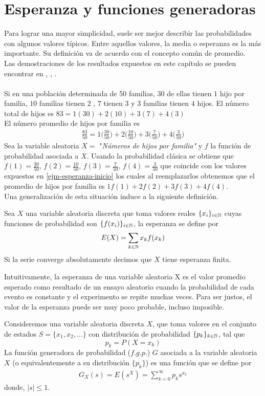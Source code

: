 \section{Esperanza y funciones generadoras}
Para lograr una mayor simplicidad, suele ser mejor describir las probabilidades con algunos valores típicos. Entre aquellos valores, la media o esperanza es la más importante. Su definición va de acuerdo con el concepto común de promedio. \\Las demostraciones de los resultados expuestos en este capítulo se pueden encontrar en \cite{Rincon1}, \cite{Rincon2},  \cite{Feller}.
\\\\
Si en una población determinada de 50 familias, $30$ de ellas tienen $1$ hijo por familia, $10$ familias tienen $2$ , $7$ tienen $3$ y $3$ familias tienen $4$ hijos. El número total de hijos es $83=1(30)+2(10)+3(7)+4(3)$\\
El número promedio de hijos por familia es 
\begin{eqnarray}
    \label{ejm-esperanza-inicio}
    \frac{83}{50}= 1\big(\frac{30}{50}\big)+2\big(\frac{10}{50}\big)+3\big(\frac{7}{50}\big)+4\big(\frac{3}{50}\big)
\end{eqnarray}
Sea la variable aleatoria $X=$ "\textit{Números de hijos por familia"} y $f$ la función de probabilidad asociada a $X$. Usando la probabilidad clásica se obtiene que $f(1)=\frac{30}{50}$, $f(2)=\frac{10}{50}$, $f(3)=\frac{7}{50}$, $f(4)=\frac{3}{50}$ que coincide con los valores expuestos en \ref{ejm-esperanza-inicio} los cuales al reemplazarlos obtenemos que el promedio de hijos por familia es $1f(1)+2f(2)+3f(3)+4f(4)$.\\
Una generalización de esta situación induce a la siguiente definición.
\begin{Def}
    Sea $X$ una variable aleatoria discreta que toma valores reales $\{x_i\}_{i\in{\mathbb{N}}}$ cuyas funciones de probabilidad son $\{f(x_i)\}_{i\in{\mathbb{N}}}$, la esperanza se define por $$E(X)=\sum_{k\in{\mathbb{N}}} x_k f(x_k)$$ Si la serie converge absolutamente decimos que $X$ tiene esperanza finita.
\end{Def}
Intuitivamente, la esperanza de una variable aleatoria X es el valor promedio esperado como resultado de un ensayo aleatorio cuando la probabilidad de cada evento es constante y el experimento se repite muchas veces. Para ser justos, el valor de la esperanza puede ser muy poco probable, incluso imposible.  
\begin{Def}
    \label{def-prob-funcionGeneraProb}
    Consideremos una variable aleatoria discreta $X$, que toma valores en el conjunto de estados $S=\{x_1,x_2,\ldots\}$ con distribución de probabilidad $\{p_k\}_{k\in{\mathbb{N}}}$, tal que $$p_k=P(X=x_k)$$ 
    La función generadora de probabilidad ($f.g.p.$) $G$ asociada a la variable aleatoria $X$ (o equivalentemente a su distribución $\{p_k\}$) es una función que se define por 
    \begin{eqnarray}
        G_X(s)=E(s^X)=\sum_{k=0}^\infty p_k s^{x_k} \label{def-funcionGeneradoraProb}
    \end{eqnarray} 
    donde,  $|s|\leq 1$.
\end{Def}
